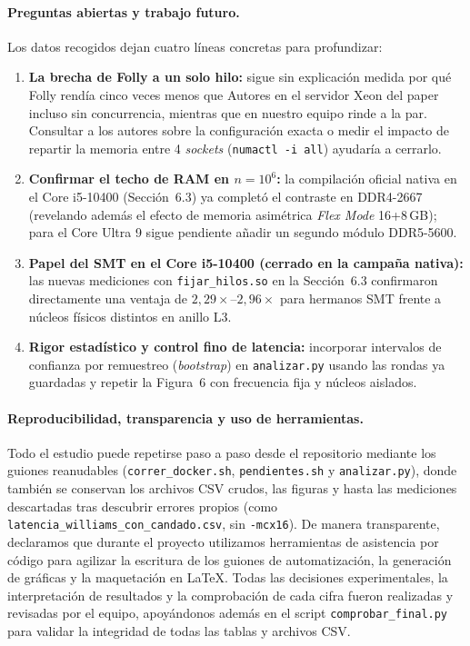 \documentclass[11pt,a4paper]{article}
\begin{document}
\paragraph{Preguntas abiertas y trabajo futuro.}
Los datos recogidos dejan cuatro líneas concretas para profundizar:
\begin{enumerate}
  \item \textbf{La brecha de Folly a un solo hilo:} sigue sin explicación medida por qué Folly rendía cinco veces menos que Autores en el servidor Xeon del paper incluso sin concurrencia, mientras que en nuestro equipo rinde a la par. Consultar a los autores sobre la configuración exacta o medir el impacto de repartir la memoria entre 4 \emph{sockets} (\texttt{numactl -i all}) ayudaría a cerrarlo.
  \item \textbf{Confirmar el techo de RAM en $n = 10^6$:} la compilación oficial nativa en el Core i5-10400 (Sección~6.3) ya completó el contraste en DDR4-2667 (revelando además el efecto de memoria asimétrica \emph{Flex Mode} 16+8\,GB); para el Core Ultra 9 sigue pendiente añadir un segundo módulo DDR5-5600.
  \item \textbf{Papel del SMT en el Core i5-10400 (cerrado en la campaña nativa):} las nuevas mediciones con \texttt{fijar\_hilos.so} en la Sección~6.3 confirmaron directamente una ventaja de $2,29\times$--$2,96\times$ para hermanos SMT frente a núcleos físicos distintos en anillo L3.
  \item \textbf{Rigor estadístico y control fino de latencia:} incorporar intervalos de confianza por remuestreo (\emph{bootstrap}) en \texttt{analizar.py} usando las rondas ya guardadas y repetir la Figura~6 con frecuencia fija y núcleos aislados.
\end{enumerate}

\paragraph{Reproducibilidad, transparencia y uso de herramientas.}
Todo el estudio puede repetirse paso a paso desde el repositorio mediante los guiones reanudables (\texttt{correr\_\allowbreak docker.sh}, \texttt{pendientes.sh} y \texttt{analizar.py}), donde también se conservan los archivos CSV crudos, las figuras y hasta las mediciones descartadas tras descubrir errores propios (como \texttt{latencia\_\allowbreak williams\_\allowbreak con\_\allowbreak candado.csv}, sin \texttt{-mcx16}). De manera transparente, declaramos que durante el proyecto utilizamos herramientas de asistencia por código para agilizar la escritura de los guiones de automatización, la generación de gráficas y la maquetación en \LaTeX. Todas las decisiones experimentales, la interpretación de resultados y la comprobación de cada cifra fueron realizadas y revisadas por el equipo, apoyándonos además en el script \texttt{comprobar\_\allowbreak final.py} para validar la integridad de todas las tablas y archivos CSV.



\end{document}
